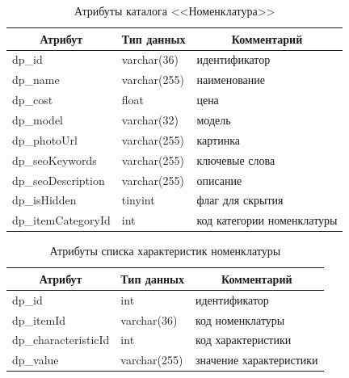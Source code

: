 \begin{table}[!htb]
    \centering\small

    \caption{Атрибуты каталога <<Номенклатура>>}
    \label{tab:DP_CTL_Items}

    \begin{tabular}{|p{5cm}|p{2.5cm}|p{9cm}|}
        \hline
        \multicolumn{1}{|c|}{Атрибут}
        & \multicolumn{1}{c|}{Тип данных}
        & \multicolumn{1}{c|}{Комментарий}
        \\ \hline

        dp\_id & varchar(36) & идентификатор \\ \hline
        dp\_name & varchar(255) & наименование \\ \hline
        dp\_cost & float & цена \\ \hline
        dp\_model & varchar(32) & модель \\ \hline
        dp\_photoUrl & varchar(255) & картинка\\ \hline
        dp\_seoKeywords & varchar(255) & ключевые слова \\ \hline
        dp\_seoDescription & varchar(255) & описание \\ \hline
        dp\_isHidden & tinyint & флаг для скрытия \\ \hline
        dp\_itemCategoryId & int & код категории номенклатуры \\ \hline
    \end{tabular}
\end{table}


\begin{table}[!htb]
    \centering\small

    \caption{Атрибуты списка характеристик номенклатуры}
    \label{tab:DP_LST_ItemCharacteristics}

    \begin{tabular}{|p{5cm}|p{2.5cm}|p{9cm}|}
        \hline
        \multicolumn{1}{|c|}{Атрибут}
        & \multicolumn{1}{c|}{Тип данных}
        & \multicolumn{1}{c|}{Комментарий}
        \\ \hline

        dp\_id & int & идентификатор \\ \hline
        dp\_itemId & varchar(36) & код номенклатуры \\ \hline
        dp\_characteristicId & int & код характеристики \\ \hline
        dp\_value & varchar(255) & значение характеристики \\ \hline
    \end{tabular}
\end{table}

